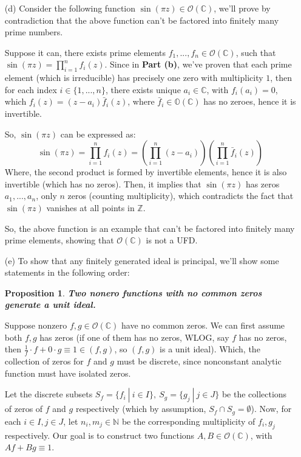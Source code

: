 \documentclass{article}
\newtheorem{proposition}{Proposition}
\begin{document}
\begin{itemize}
    \hfil

    \item[(d)] Consider the following function $\sin(\pi z)\in\mathcal{O}(\mathbb{C})$, we'll prove by contradiction that the above function can't be factored into finitely many prime numbers.
    
    Suppose it can, there exists prime elements $f_1,...,f_n\in\mathcal{O}(\mathbb{C})$, such that $\sin(\pi z)=\prod_{i=1}^{n}f_i(z)$.
    Since in \textbf{Part (b)}, we've proven that each prime element (which is irreducible) has precisely one zero with multiplicity $1$, then for each index $i\in\{1,...,n\}$,
    there exists unique $a_i\in\mathbb{C}$, with $f_i(a_i)=0$, which $f_i(z)=(z-a_i)\bar{f}_i(z)$, where $\bar{f}_i\in\mathbb{O}(\mathbb{C})$ has no zeroes, hence it is invertible.

    So, $\sin(\pi z)$ can be expressed as:
    $$\sin(\pi z)=\prod_{i=1}^{n}f_i(z) = \left(\prod_{i=1}^{n}(z-a_i)\right)\left(\prod_{i=1}^{n}\bar{f}_i(z)\right)$$
    Where, the second product is formed by invertible elements, hence it is also invertible (which has no zeros). Then, it implies that $\sin(\pi z)$ has zeros $a_1,...,a_n$, only $n$ zeros (counting multiplicity), which contradicts the fact that $\sin(\pi z)$ vanishes at all points in $\mathbb{Z}$.

    So, the above function is an example that can't be factored into finitely many prime elements, showing that $\mathcal{O}(\mathbb{C})$ is not a UFD.

    \hfil

    \item[(e)] To show that any finitely generated ideal is principal, we'll show some statements in the following order:

    \begin{proposition}
        \textbf{Two nonero functions with no common zeros generate a unit ideal.}
    \end{proposition}

    Suppose nonzero $f,g\in\mathcal{O}(\mathbb{C})$ have no common zeros. We can first assume both $f,g$ has zeros (if one of them has no zeros, WLOG, say $f$ has no zeros, then $\frac{1}{f}\cdot f+0\cdot g \equiv 1\in (f,g)$, so $(f,g)$ is a unit ideal).
    Which, the collection of zeros for $f$ and $g$ must be discrete, since nonconstant analytic function must have isolated zeros.

    Let the discrete subsets $S_f=\{f_i\ |\ i\in I\},\ S_g=\{g_j\ |\ j\in J\}$ be the collections of zeros of $f$ and $g$ respectively (which by assumption, $S_f\cap S_g=\emptyset$). Now, for each $i\in I, j\in J$, let $n_i,m_j\in\mathbb{N}$ be the corresponding multiplicity of $f_i,g_j$ respectively.
    Our goal is to construct two functions $A,B\in\mathcal{O}(\mathbb{C})$, with $Af+Bg\equiv 1$.


\end{itemize}
\end{document}
